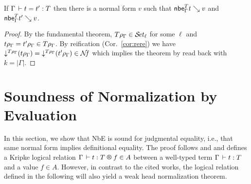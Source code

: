 \documentclass[acmlarge,review,anonymous]{acmart}\settopmatter{printfolios=true}
\begin{document}
\begin{theorem}
  If\/ $\Gamma \der t = t' : T$ then there is a normal form $v$ such that
  $\nbe \Gamma T t \evalsto v$ and $\nbe \Gamma T {t'} \evalsto v$.
\end{theorem}
\begin{proof}
  By the fundamental theorem, $T \rho_\Gamma \in \SET[\ell]$ for some $\ell$ and
  $t \rhog = t' \rhog \in T\rhog$.  By reification (Cor.~\ref{cor:rere}) we have
  $\down{T\rhog} (t\rhog) = \down{T\rhog}(t'\rhog) \in \NF$ which implies the theorem
  by read back with $k = |\Gamma|$.
\end{proof}



\section{Soundness  of Normalization by Evaluation}
\label{sec:soundnbe}

In this section, we show that NbE is sound for judgmental equality,
i.e., that same normal form implies definitional equality.  The proof
follows \citet{abelCoquandDybjer:lics07} and
\citet{fridlenderPagano:tlca13} and defines a Kripke logical relation
$\LR \Gamma t T f A$ between a well-typed term $\Gamma \der t : T$ and
a value $f \in A$.
However, in contrast to the cited works,
the logical relation defined in the following will also yield a weak
head normalization theorem.
\end{document}
